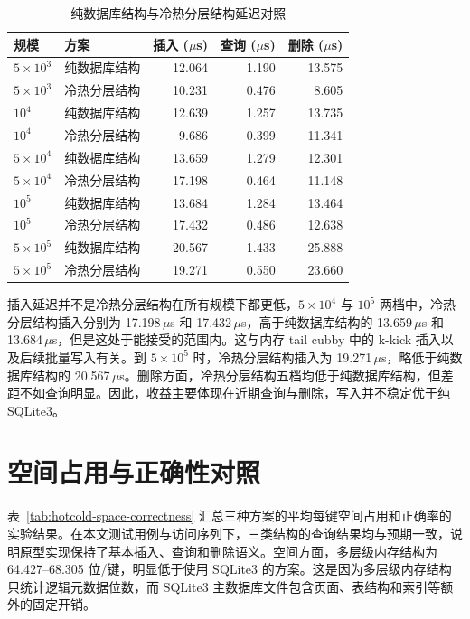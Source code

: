 \begin{table}[htbp]
  \centering
  \caption{纯数据库结构与冷热分层结构延迟对照}
  \label{tab:hotcold-sqlite-latency}
  \small
  \begin{tabular}{llrrr}
    \toprule
    规模 & 方案 & 插入 ($\mu$s) & 查询 ($\mu$s) & 删除 ($\mu$s) \\
    \midrule
    \(5\times10^3\)   & 纯数据库结构 & 12.064 & 1.190 & 13.575 \\
    \(5\times10^3\)   & 冷热分层结构 & 10.231 & 0.476 & 8.605 \\
    \(10^4\)          & 纯数据库结构 & 12.639 & 1.257 & 13.735 \\
    \(10^4\)          & 冷热分层结构 & 9.686  & 0.399 & 11.341 \\
    \(5\times10^4\)   & 纯数据库结构 & 13.659 & 1.279 & 12.301 \\
    \(5\times10^4\)   & 冷热分层结构 & 17.198 & 0.464 & 11.148 \\
    \(10^5\)          & 纯数据库结构 & 13.684 & 1.284 & 13.464 \\
    \(10^5\)          & 冷热分层结构 & 17.432 & 0.486 & 12.638 \\
    \(5\times10^5\)   & 纯数据库结构 & 20.567 & 1.433 & 25.888 \\
    \(5\times10^5\)   & 冷热分层结构 & 19.271 & 0.550 & 23.660 \\
    \bottomrule
  \end{tabular}
\end{table}

插入延迟并不是冷热分层结构在所有规模下都更低，\(5\times10^4\) 与 \(10^5\) 两档中，冷热分层结构插入分别为 17.198\,$\mu$s 和 17.432\,$\mu$s，高于纯数据库结构的 13.659\,$\mu$s 和 13.684\,$\mu$s，但是这处于能接受的范围内。这与内存 tail cubby 中的 k-kick 插入以及后续批量写入有关。到 \(5\times10^5\) 时，冷热分层结构插入为 19.271\,$\mu$s，略低于纯数据库结构的 20.567\,$\mu$s。删除方面，冷热分层结构五档均低于纯数据库结构，但差距不如查询明显。因此，收益主要体现在近期查询与删除，写入并不稳定优于纯 SQLite3。

\section{空间占用与正确性对照}

表~\ref{tab:hotcold-space-correctness} 汇总三种方案的平均每键空间占用和正确率的实验结果。在本文测试用例与访问序列下，三类结构的查询结果均与预期一致，说明原型实现保持了基本插入、查询和删除语义。空间方面，多层级内存结构为 64.427--68.305 位/键，明显低于使用 SQLite3 的方案。这是因为多层级内存结构只统计逻辑元数据位数，而 SQLite3 主数据库文件包含页面、表结构和索引等额外的固定开销。

